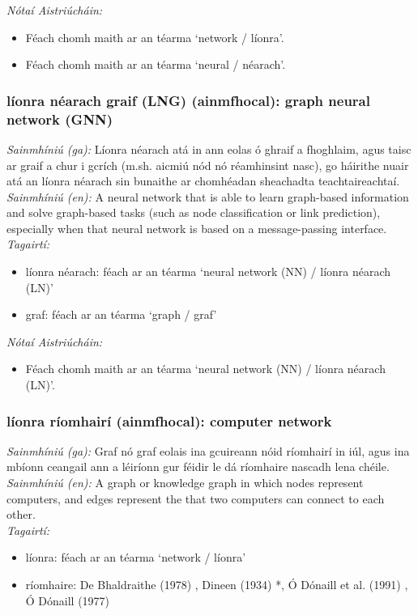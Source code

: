 \documentclass{article}
\begin{document}
 \noindent \textit{Nótaí Aistriúcháin:}
\begin{itemize}
	\item Féach chomh maith ar an téarma `network / líonra'.
	\item Féach chomh maith ar an téarma `neural / néarach'.
\end{itemize}


\subsubsection*{líonra néarach graif (LNG) (ainmfhocal): graph neural network (GNN)}
 \noindent \textit{Sainmhíniú (ga):} Líonra néarach atá in ann eolas ó ghraif a fhoghlaim, agus taisc ar graif a chur i gcrích (m.sh. aicmiú nód nó réamhinsint nasc), go háirithe nuair atá an líonra néarach sin bunaithe ar chomhéadan sheachadta teachtaireachtaí.
\\
 \noindent \textit{Sainmhíniú (en):} A neural network that is able to learn graph-based information and solve graph-based tasks (such as node classification or link prediction), especially when that neural network is based on a message-passing interface.
\\
 \noindent \textit{Tagairtí:}
\begin{itemize}
	\item líonra néarach: féach ar an téarma `neural network (NN) / líonra néarach (LN)'
	\item graf: féach ar an téarma `graph / graf'
\end{itemize}

 \noindent \textit{Nótaí Aistriúcháin:}
\begin{itemize}
	\item Féach chomh maith ar an téarma `neural network (NN) / líonra néarach (LN)'.
\end{itemize}


\subsubsection*{líonra ríomhairí (ainmfhocal): computer network}
 \noindent \textit{Sainmhíniú (ga):} Graf nó graf eolais ina gcuireann nóid ríomhairí in iúl, agus ina mbíonn ceangail ann a léiríonn gur féidir le dá ríomhaire nascadh lena chéile.
\\
 \noindent \textit{Sainmhíniú (en):} A graph or knowledge graph in which nodes represent computers, and edges represent the that two computers can connect to each other.
\\
 \noindent \textit{Tagairtí:}
\begin{itemize}
	\item líonra: féach ar an téarma `network / líonra'
	\item ríomhaire: De Bhaldraithe (1978) \cite{de-bhaldraithe}, Dineen (1934) \cite{dineen}*, Ó Dónaill et al. (1991) \cite{focloir-beag}, Ó Dónaill (1977) \cite{odonaill}
\end{itemize}
\end{document}

